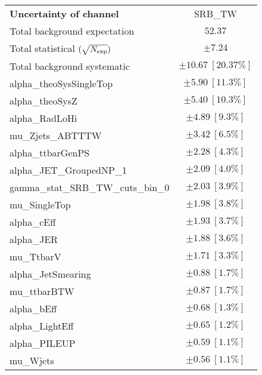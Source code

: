 
\begin{table}
\begin{center}
\setlength{\tabcolsep}{0.0pc}
\begin{tabular*}{\textwidth}{@{\extracolsep{\fill}}lc}
\noalign{\smallskip}\hline\noalign{\smallskip}
{\bf Uncertainty of channel}                                    & SRB\_TW            \\
\noalign{\smallskip}\hline\noalign{\smallskip}
Total background expectation             &  $52.37$       \\
\noalign{\smallskip}\hline\noalign{\smallskip}
Total statistical $(\sqrt{N_{\rm exp}})$              & $\pm 7.24$       \\
Total background systematic               & $\pm 10.67\ [20.37\%] $             \\
\noalign{\smallskip}\hline\noalign{\smallskip}
\noalign{\smallskip}\hline\noalign{\smallskip}
alpha\_theoSysSingleTop         & $\pm 5.90\ [11.3\%] $       \\
alpha\_theoSysZ         & $\pm 5.40\ [10.3\%] $       \\
alpha\_RadLoHi         & $\pm 4.89\ [9.3\%] $       \\
mu\_Zjets\_ABTTTW         & $\pm 3.42\ [6.5\%] $       \\
alpha\_ttbarGenPS         & $\pm 2.28\ [4.3\%] $       \\
alpha\_JET\_GroupedNP\_1         & $\pm 2.09\ [4.0\%] $       \\
gamma\_stat\_SRB\_TW\_cuts\_bin\_0         & $\pm 2.03\ [3.9\%] $       \\
mu\_SingleTop         & $\pm 1.98\ [3.8\%] $       \\
alpha\_cEff         & $\pm 1.93\ [3.7\%] $       \\
alpha\_JER         & $\pm 1.88\ [3.6\%] $       \\
mu\_TtbarV         & $\pm 1.71\ [3.3\%] $       \\
alpha\_JetSmearing         & $\pm 0.88\ [1.7\%] $       \\
mu\_ttbarBTW         & $\pm 0.87\ [1.7\%] $       \\
alpha\_bEff         & $\pm 0.68\ [1.3\%] $       \\
alpha\_LightEff         & $\pm 0.65\ [1.2\%] $       \\
alpha\_PILEUP         & $\pm 0.59\ [1.1\%] $       \\
mu\_Wjets         & $\pm 0.56\ [1.1\%] $       \\

\end{tabular*}
\end{center}
\end{table}
